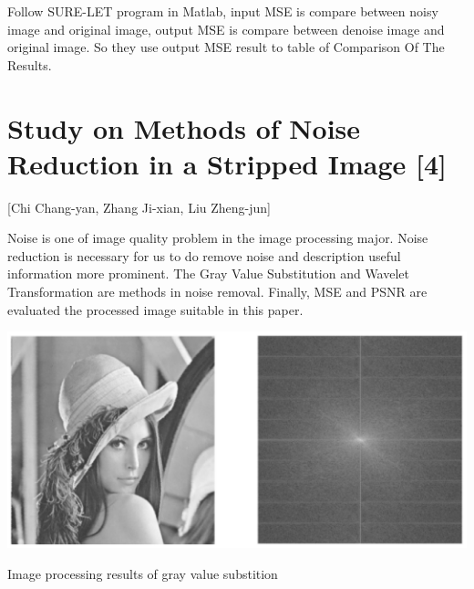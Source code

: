 \vspace{1cm}


Follow SURE-LET program in Matlab, input MSE is compare between noisy image and original image, output MSE is compare between denoise image and original image. So they use output MSE result to table of Comparison Of The Results.
\vspace{1.5cm}

\section{Study on Methods of Noise Reduction in a Stripped Image [4]}

[Chi Chang-yan, Zhang Ji-xian, Liu Zheng-jun]


Noise is one of  image quality problem in the image processing major. Noise reduction is necessary for us to do remove noise and description useful information more prominent. The Gray Value Substitution and Wavelet Transformation are methods in noise removal. Finally, MSE and PSNR are evaluated the processed image suitable in this paper.





\begin{center}
\includegraphics{gray.png}

 Image processing results of gray value substition 
\end{center}

